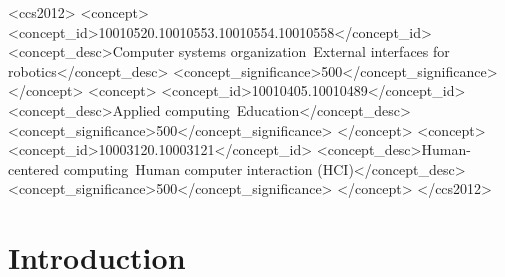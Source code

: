 \documentclass{sig-alternate-05-2015}
\begin{document}
%
%
 \begin{CCSXML}
	<ccs2012>
	<concept>
	<concept_id>10010520.10010553.10010554.10010558</concept_id>
	<concept_desc>Computer systems organization~External interfaces for robotics</concept_desc>
	<concept_significance>500</concept_significance>
	</concept>
	<concept>
	<concept_id>10010405.10010489</concept_id>
	<concept_desc>Applied computing~Education</concept_desc>
	<concept_significance>500</concept_significance>
	</concept>
	<concept>
	<concept_id>10003120.10003121</concept_id>
	<concept_desc>Human-centered computing~Human computer interaction (HCI)</concept_desc>
	<concept_significance>500</concept_significance>
	</concept>
	</ccs2012>
\end{CCSXML}


%
%

%
%
\printccsdesc


\section{Introduction}
\end{document}
